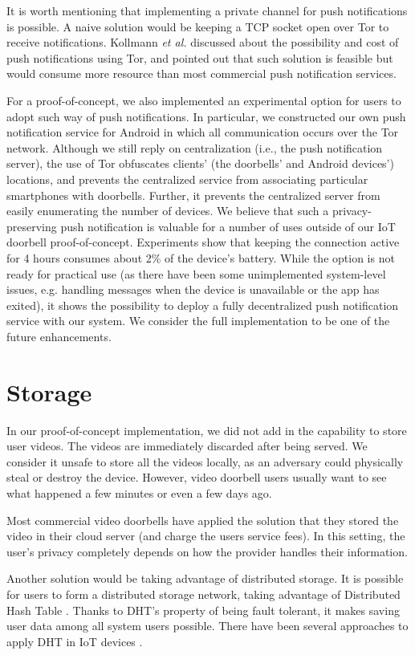 It is worth mentioning that implementing a private channel for push notifications is possible. A naive solution would be keeping a TCP socket open over Tor to receive notifications. Kollmann \textit{et al.} \cite{kollmann2017cost} discussed about the possibility and cost of push notifications using Tor, and pointed out that such solution is feasible but would consume more resource than most commercial push notification services.

For a proof-of-concept, we also implemented an experimental option for users to adopt such way of push notifications. In particular, we constructed our own push notification service for Android in which all communication occurs over the Tor network. Although we still reply on centralization (i.e., the push notification server), the use of Tor obfuscates clients' (the doorbells' and Android devices') locations, and prevents the centralized service from associating particular smartphones with doorbells. Further, it prevents the centralized server from easily enumerating the number of devices. We believe that such a privacy-preserving push notification is valuable for a number of uses outside of our IoT doorbell proof-of-concept. Experiments show that keeping the connection active for 4 hours consumes about 2\% of the device's battery. While the option is not ready for practical use (as there have been some unimplemented system-level issues, e.g. handling messages when the device is unavailable or the app has exited), it shows the possibility to deploy a fully decentralized push notification service with our system. We consider the full implementation to be one of the future enhancements.

\section{Storage}
In our proof-of-concept implementation, we did not add in the capability to store user videos. The videos are immediately discarded after being served. We consider it unsafe to store all the videos locally, as an adversary could physically steal or destroy the device. However, video doorbell users usually want to see what happened a few minutes or even a few days ago.

Most commercial video doorbells have applied the solution that they stored the video in their cloud server (and charge the users service fees). In this setting, the user's privacy completely depends on how the provider handles their information.

Another solution would be taking advantage of distributed storage. It is possible for users to form a distributed storage network, taking advantage of Distributed Hash Table \cite{stoica2001chord}. Thanks to DHT's property of being fault tolerant, it makes saving user data among all system users possible. There have been several approaches to apply DHT in IoT devices \cite{fabian2014privacy} \cite{paganelli2012dht}.

